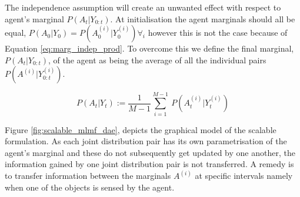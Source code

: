 The independence assumption will create an unwanted effect with respect to agent's marginal $P(A_t|Y_{0:t})$. 
At initialisation the agent marginals should all be equal, $P(A_0|Y_0) = P(A^{(i)}_0|Y^{(i)}_0) \forall_i$ however this is not the case because of 
Equation \ref{eq:marg_indep_prod}. To overcome this we define the final marginal, $P(A_t|Y_{0:t})$, of the agent as being the average of all the individual
pairs $P(A^{(i)}|Y^{(i)}_{0:t})$.

\begin{equation}
  P(A_t|Y_t) := \frac{1}{M-1} \sum\limits_{i=1}^{M-1} \ P(A^{(i)}_t|Y^{(i)}_t) \label{eq:marg_indep_sum}
\end{equation}

Figure \ref{fig:scalable_mlmf_dae}, depicts the graphical model of the scalable formulation. 
As each joint distribution pair has its own parametrisation of the agent's marginal and these do not subsequently get updated by one another,
the information gained by one joint distribution pair is not transferred.
A remedy is to transfer information between the marginals $A^{(i)}$ at specific intervals namely when one of the objects is sensed by the agent. 





